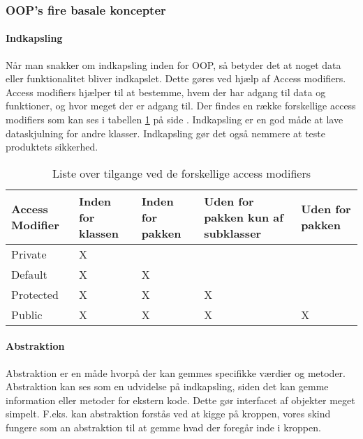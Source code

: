 \subsubsection{OOP's fire basale koncepter }

    \paragraph{Indkapsling} 
    Når man snakker om indkapsling inden for OOP, så betyder det at noget data eller funktionalitet bliver indkapslet. Dette gøres ved hjælp af Access modifiers. Access modifiers hjælper til at bestemme, hvem der har adgang til data og funktioner, og hvor meget der er adgang til. Der findes en række forskellige access modifiers som kan ses i tabellen \ref{tab:Access modifier} på side \pageref{tab:Access modifier}. Indkapsling er en god måde at lave dataskjulning for andre klasser. Indkapsling gør det også nemmere at teste produktets sikkerhed. 
        
        \begin{table}[H]
        \centering
            \begin{tabular}{p{2cm}|p{2cm}|p{2cm}|p{3cm}|p{2cm}}
                \textbf{Access Modifier} & \textbf{Inden for klassen} &
                \textbf{Inden for pakken} & \textbf{Uden for pakken kun af
                subklasser} & \textbf{  Uden for pakken} \\
                \hline
                Private   & X &   &   &   \\
                \hline
                Default   & X & X &   &   \\
                \hline
                Protected & X & X & X &   \\
                \hline
                Public    & X & X & X & X \\
            \end{tabular}%
            \caption{Liste over tilgange ved de forskellige access modifiers}
            \label{tab:Access modifier}
        \end{table}

    \paragraph{Abstraktion} 
    Abstraktion er en måde hvorpå der kan gemmes specifikke værdier og metoder. Abstraktion kan ses som en udvidelse på indkapsling, siden det kan gemme information eller metoder for ekstern kode. Dette gør interfacet af objekter meget simpelt. F.eks. kan abstraktion forstås ved at kigge på kroppen, vores skind fungere som an abstraktion til at gemme hvad der foregår inde i kroppen.


